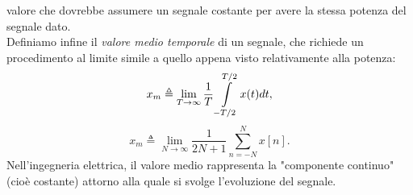 \documentclass[12pt,oneside,openany]{memoir}
\numberwithin{equation}{subsection}
\begin{document}
valore che dovrebbe assumere un segnale costante per avere la stessa potenza del
segnale dato.\\
Definiamo infine il \textit{valore medio temporale} di un segnale, che richiede
un procedimento al limite simile a quello appena visto relativamente alla
potenza:
\begin{equation}
	x_m \triangleq \lim_{T \rightarrow \infty} \frac{1}{T}
	\int\displaylimits_{-T/2}^{T/2} x(t) dt,
\end{equation}
\begin{equation}
	x_m \triangleq \lim_{N \rightarrow \infty} \frac{1}{2N + 1}
	\sum_{n = -N}^{N} x[n].
\end{equation}
Nell'ingegneria elettrica, il valore medio rappresenta la "componente continuo"
(cio\`e costante) attorno alla quale si svolge l'evoluzione del segnale.

\end{document}
